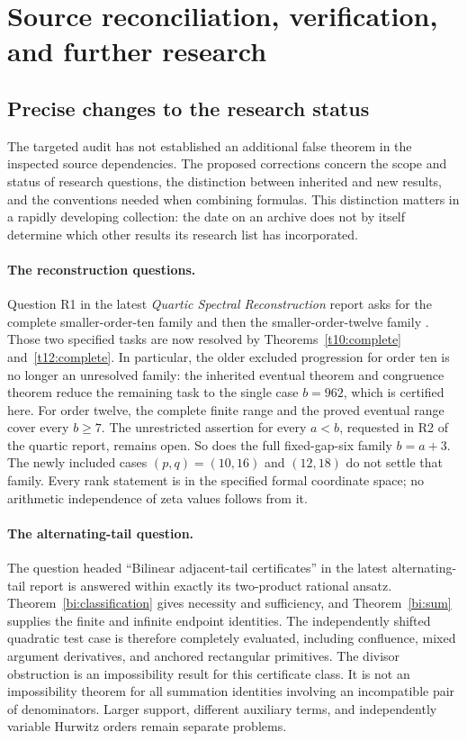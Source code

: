 \section{Source reconciliation, verification, and further research}
\label{audit:section}

\subsection{Precise changes to the research status}

The targeted audit has not established an additional false theorem in
the inspected source dependencies. The proposed corrections concern
the scope and status of research questions, the distinction between
inherited and new results, and the conventions needed when combining
formulas. This distinction matters in a rapidly developing collection:
the date on an archive does not by itself determine which other results
its research list has incorporated.

\paragraph{The reconstruction questions.}
Question R1 in the latest \emph{Quartic Spectral Reconstruction}
report asks for the complete smaller-order-ten family and then the
smaller-order-twelve family \cite{tail-quartic}. Those two specified
tasks are now resolved by Theorems~\ref{t10:complete}
and~\ref{t12:complete}. In particular, the older excluded progression
for order ten is no longer an unresolved family: the inherited
eventual theorem and congruence theorem reduce the remaining task
to the single case $b=962$, which is certified here. For order twelve,
the complete finite range and the proved eventual range cover every
$b\ge7$. The unrestricted assertion for every $a<b$, requested in
R2 of the quartic report, remains open. So does the full fixed-gap-six
family $b=a+3$. The newly included cases $(p,q)=(10,16)$ and $(12,18)$
do not settle that family. Every rank statement is in the specified
formal coordinate space; no arithmetic independence of zeta values
follows from it.

\paragraph{The alternating-tail question.}
The question headed ``Bilinear adjacent-tail certificates'' in the
latest alternating-tail report \cite{tail-alternating} is answered
within exactly its two-product rational ansatz. Theorem~\ref{bi:classification}
gives necessity and sufficiency, and Theorem~\ref{bi:sum} supplies the
finite and infinite endpoint identities. The independently shifted
quadratic test case is therefore completely evaluated, including
confluence, mixed argument derivatives, and anchored rectangular
primitives. The divisor obstruction is an impossibility result for
this certificate class. It is not an impossibility theorem for all
summation identities involving an incompatible pair of denominators.
Larger support, different auxiliary terms, and independently variable
Hurwitz orders remain separate problems.

